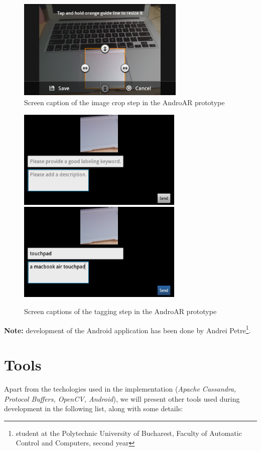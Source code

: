 \documentclass[a4paper,onecolumn,oneside,titlepage,11pt]{report}
\begin{document}
\begin{figure}[H]
\begin{center}
\includegraphics[width=8cm]{../../images/crop.png}
\caption{Screen caption of the image crop step in the AndroAR prototype}
\end{center}
\end{figure}

\begin{figure}[H]
\begin{center}
\includegraphics[width=7.9cm]{../../images/metadata.png}
\includegraphics[width=7.9cm]{../../images/metadata_send.png}
\caption{Screen captions of the tagging step in the AndroAR prototype}
\end{center}
\end{figure}

\textbf{Note:} development of the Android application has been done by Andrei Petre\footnote{student at the Polytechnic University of Bucharest, Faculty of Automatic Control and Computers, second year}.

\section{Tools}
\label{sec:tools}
Apart from the techologies used in the implementation (\emph{Apache Cassandra, Protocol Buffers, OpenCV, Android}), we will present other tools used during development in the following list, along with some details:
\end{document}
